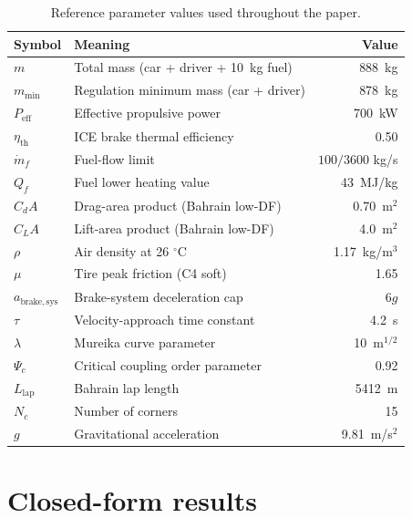 \documentclass[11pt,twocolumn]{article}
\theoremstyle{definition}
\theoremstyle{remark}
\begin{document}
\begin{table}[!t]
\centering
\caption{Reference parameter values used throughout the paper.}
\begin{tabular}{llr}
\toprule
Symbol & Meaning & Value\\
\midrule
$m$                  & Total mass (car + driver + 10~kg fuel)   & 888~kg\\
$m_{\min}$           & Regulation minimum mass (car + driver)   & 878~kg\\
$P_{\mathrm{eff}}$   & Effective propulsive power                & 700~kW\\
$\eta_{\mathrm{th}}$ & ICE brake thermal efficiency              & 0.50\\
$\dot m_f$           & Fuel-flow limit                           & $100/3600$ kg/s\\
$Q_f$                & Fuel lower heating value                  & 43~MJ/kg\\
$C_d A$              & Drag-area product (Bahrain low-DF)       & 0.70~m$^2$\\
$C_L A$              & Lift-area product (Bahrain low-DF)       & 4.0~m$^2$\\
$\rho$               & Air density at 26 $^{\circ}$C            & 1.17~kg/m$^3$\\
$\mu$                & Tire peak friction (C4 soft)              & 1.65\\
$a_{\mathrm{brake,sys}}$ & Brake-system deceleration cap        & $6g$\\
$\tau$               & Velocity-approach time constant           & 4.2~s\\
$\lambda$            & Mureika curve parameter                   & 10~m$^{1/2}$\\
$\Psi_c$             & Critical coupling order parameter         & 0.92\\
$L_{\mathrm{lap}}$   & Bahrain lap length                        & 5412~m\\
$N_c$                & Number of corners                         & 15\\
$g$                  & Gravitational acceleration                & 9.81~m/s$^2$\\
\bottomrule
\end{tabular}
\end{table}

\section{Closed-form results}
\label{app:closed}
\end{document}

